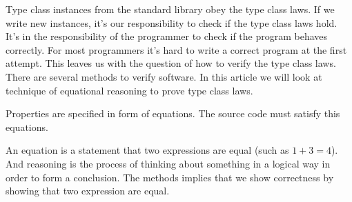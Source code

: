 Type class instances from the standard library obey the type class laws. If we write new instances, it's our responsibility to check if the type class laws hold.
It's in the responsibility of the programmer to check if the program behaves correctly. For most programmers it's hard to write a correct program at the first attempt. This leaves us with the question of how to verify the type class laws. There are several methods to verify software. In this article we will look at technique of equational reasoning to prove type class laws. 

Properties are specified in form of equations. The source code must satisfy this equations. 



An equation is a statement that two expressions are equal (such as $1 + 3 = 4$). And reasoning is the process of thinking about something in a logical way in order to form a conclusion. The methods implies that we show correctness by showing that two expression are equal. 

